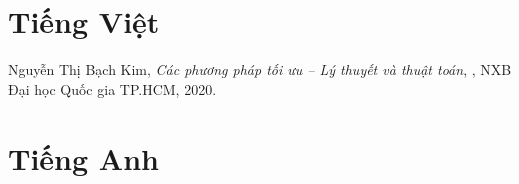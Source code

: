 \documentclass[oneside, a4paper]{book}
\theoremstyle{plain}
\theoremstyle{definition}
\theoremstyle{definition}
\theoremstyle{remark}
\begin{document}
%
%
%
%

\begin{thebibliography}{99}\rm
{}

\section*{Tiếng Việt}

 Nguyễn Thị Bạch Kim, \textit{Các phương pháp tối ưu – Lý thuyết và thuật toán}, , NXB Đại học Quốc gia TP.HCM, 2020.

\section*{Tiếng Anh}

\end{thebibliography}

\setcounter{lastbibitem}{\value{enumiv}}
\end{document}
